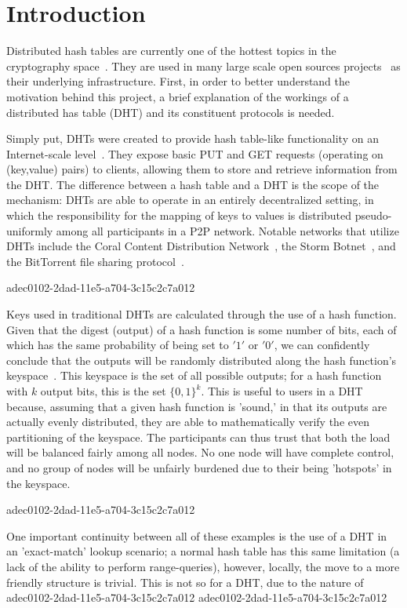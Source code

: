 \documentclass[12pt]{article}
\begin{document}
\section{Introduction}
\par Distributed hash tables are currently one of the hottest topics in the cryptography space~\cite{Stoica:2001dj,Rowstron:2001ea,Ratnasamy:2001wn}. They are used in many large scale open sources projects~\cite{Freitas:2013tb,Xu:2010vs,Perfitt:2010fh} as their underlying infrastructure. First, in order to better understand the motivation behind this project, a brief explanation of the workings of a distributed has table (DHT) and its constituent protocols is needed.

\par Simply put, DHTs were created to provide hash table-like functionality on an Internet-scale level~\cite{Ratnasamy:2001wn}. They expose basic PUT and GET requests (operating on (key,value) pairs) to clients, allowing them to store and retrieve information from the DHT. The difference between a hash table and a DHT is the scope of the mechanism: DHTs are able to operate in an entirely decentralized setting, in which the responsibility for the mapping of keys to values is distributed pseudo-uniformly among all participants in a P2P network. Notable networks that utilize DHTs include the Coral Content Distribution Network~\cite{Freedman:2004vb}, the Storm Botnet~\cite{Holz:2008uk}, and the BitTorrent file sharing protocol~\cite{Cohen:y1_8mBnw}.

adec0102-2dad-11e5-a704-3c15c2c7a012\par Keys used in traditional DHTs are calculated through the use of a hash function. Given that the digest (output) of a hash function is some number of bits, each of which has the same probability of being set to $'1'$ or $'0'$, we can confidently conclude that the outputs will be randomly distributed along the hash function's keyspace~. This keyspace is the set of all possible outputs; for a hash function with $k$ output bits, this is the set $\{0,1\}^k$. This is useful to users in a DHT because, assuming that a given hash function is 'sound,' in that its outputs are actually evenly distributed, they are able to mathematically verify the even partitioning of the keyspace. The participants can thus trust that both the load will be balanced fairly among all nodes. No one node will have complete control, and no group of nodes will be unfairly burdened due to their being 'hotspots' in the keyspace.~

adec0102-2dad-11e5-a704-3c15c2c7a012\par One important continuity between all of these examples is the use of a DHT in an 'exact-match' lookup scenario; a normal hash table has this same limitation (a lack of the ability to perform range-queries), however, locally, the move to a more friendly structure is trivial. This is not so for a DHT, due to the nature of
adec0102-2dad-11e5-a704-3c15c2c7a012\printbibliography
adec0102-2dad-11e5-a704-3c15c2c7a012
\end{document}
